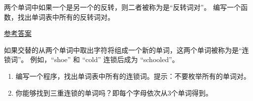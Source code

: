 \begin{exercise}


两个单词中如果一个是另一个的反转，则二者被称为是``反转词对''。
编写一个函数，找出单词表中所有的反转词对。

\href{http://thinkpython2.com/code/reverse_pair.py}{参考答案}

\end{exercise}

\begin{exercise}


如果交替的从两个单词中取出字符将组成一个新的单词，这两个单词被称为是``连锁词''。
例如，``shoe'' 和 ``cold'' 连锁后成为 ``schooled''。

\begin{enumerate}


\item 编写一个程序，找出单词表中所有的连锁词。提示：不要枚举所有的单词对。


\item 你能够找到三重连锁的单词吗？即每个字母依次从3个单词得到。

\end{enumerate}
\end{exercise}
